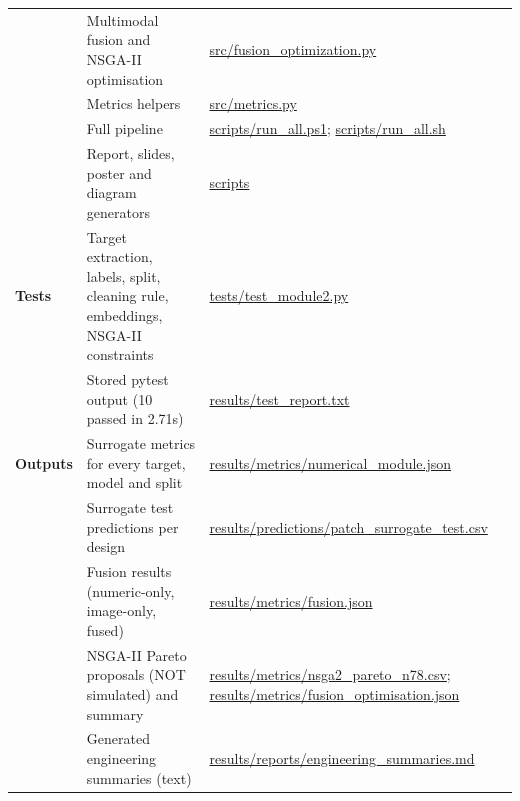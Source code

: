 \documentclass[11pt,a4paper]{article}
\begin{document}
\begin{table}[H]
\begin{tabularx}{\linewidth}{XXX}
 & Multimodal fusion and NSGA-II optimisation & \href{https://github.com/rathiabeth-sudo/902---Module-2/blob/main/src/fusion_optimization.py}{src/fusion\_optimization.py} \\
 & Metrics helpers & \href{https://github.com/rathiabeth-sudo/902---Module-2/blob/main/src/metrics.py}{src/metrics.py} \\
 & Full pipeline & \href{https://github.com/rathiabeth-sudo/902---Module-2/blob/main/scripts/run_all.ps1}{scripts/run\_all.ps1}; \href{https://github.com/rathiabeth-sudo/902---Module-2/blob/main/scripts/run_all.sh}{scripts/run\_all.sh} \\
 & Report, slides, poster and diagram generators & \href{https://github.com/rathiabeth-sudo/902---Module-2/tree/main/scripts}{scripts} \\
\textbf{Tests} & Target extraction, labels, split, cleaning rule, embeddings, NSGA-II constraints & \href{https://github.com/rathiabeth-sudo/902---Module-2/blob/main/tests/test_module2.py}{tests/test\_module2.py} \\
 & Stored pytest output (10 passed in 2.71s) & \href{https://github.com/rathiabeth-sudo/902---Module-2/blob/main/results/test_report.txt}{results/test\_report.txt} \\
\textbf{Outputs} & Surrogate metrics for every target, model and split & \href{https://github.com/rathiabeth-sudo/902---Module-2/blob/main/results/metrics/numerical_module.json}{results/metrics/numerical\_module.json} \\
 & Surrogate test predictions per design & \href{https://github.com/rathiabeth-sudo/902---Module-2/blob/main/results/predictions/patch_surrogate_test.csv}{results/predictions/patch\_surrogate\_test.csv} \\
 & Fusion results (numeric-only, image-only, fused) & \href{https://github.com/rathiabeth-sudo/902---Module-2/blob/main/results/metrics/fusion.json}{results/metrics/fusion.json} \\
 & NSGA-II Pareto proposals (NOT simulated) and summary & \href{https://github.com/rathiabeth-sudo/902---Module-2/blob/main/results/metrics/nsga2_pareto_n78.csv}{results/metrics/nsga2\_pareto\_n78.csv}; \href{https://github.com/rathiabeth-sudo/902---Module-2/blob/main/results/metrics/fusion_optimisation.json}{results/metrics/fusion\_optimisation.json} \\
 & Generated engineering summaries (text) & \href{https://github.com/rathiabeth-sudo/902---Module-2/blob/main/results/reports/engineering_summaries.md}{results/reports/engineering\_summaries.md} \\

\end{tabularx}
\end{table}
\end{document}
